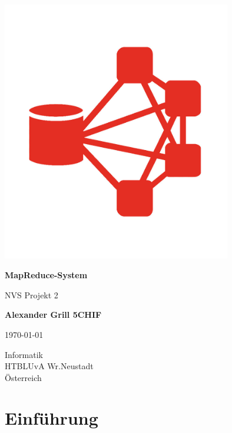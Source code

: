 \documentclass[a4paper,12pt]{article}
\begin{document}
\begin{titlepage}
    \begin{center}
        \vspace*{1cm}
        \includegraphics[width=10cm]{Logo.jpg}
        
        \textbf{\huge MapReduce-System}
        
        \vspace{0.5cm}
        NVS Projekt 2
                 
        \vspace{1.0cm}
    
        \textbf{Alexander Grill 5CHIF}
        
        \today
        
        \vfill
                 
                 
        \vspace{0.5cm}
                 
        Informatik\\
        HTBLUvA Wr.Neustadt\\
        Österreich\\

                 
    \end{center}
\end{titlepage}  
\newpage
\tableofcontents
\newpage


\section{Einführung}
\end{document}
